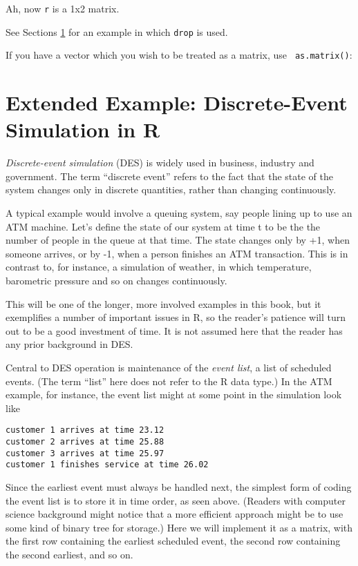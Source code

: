\noindent
Ah, now {\tt r} is a 1x2 matrix.

See Sections \ref{des} for an example in which {\tt drop} is used.

If you have a vector which you wish to be treated as a matrix, use {\tt
as.matrix()}:


\section{Extended Example:  Discrete-Event Simulation in R}
\label{des}

{\it Discrete-event simulation} (DES) is widely used in business,
industry and government.  The term ``discrete event'' refers to the fact
that the state of the system changes only in discrete quantities, rather
than changing continuously.  

A typical example would involve a queuing system, say people lining up
to use an ATM machine.  Let's define the state of our system at time t
to be the the number of people in the queue at that time.  The state
changes only by +1, when someone arrives, or by -1, when a person
finishes an ATM transaction.  This is in contrast to, for instance, a
simulation of weather, in which temperature, barometric pressure and so
on changes continuously.

This will be one of the longer, more involved examples in this book, but
it exemplifies a number of important issues in R, so the reader's
patience will turn out to be a good investment of time.  It is not
assumed here that the reader has any prior background in DES.  

Central to DES operation is maintenance of the {\it event list}, a list
of scheduled events.  (The term ``list'' here does not refer to the R
data type.)  In the ATM example, for instance, the event list might at
some point in the simulation look like

\begin{Verbatim}
customer 1 arrives at time 23.12
customer 2 arrives at time 25.88
customer 3 arrives at time 25.97
customer 1 finishes service at time 26.02
\end{Verbatim}

Since the earliest event must always be handled next, the simplest form
of coding the event list is to store it in time order, as seen above.
(Readers with computer science background might notice that a more
efficient approach might be to use some kind of binary tree for
storage.)  Here we will implement it as a matrix, with the first row
containing the earliest scheduled event, the second row containing the
second earliest, and so on. 

